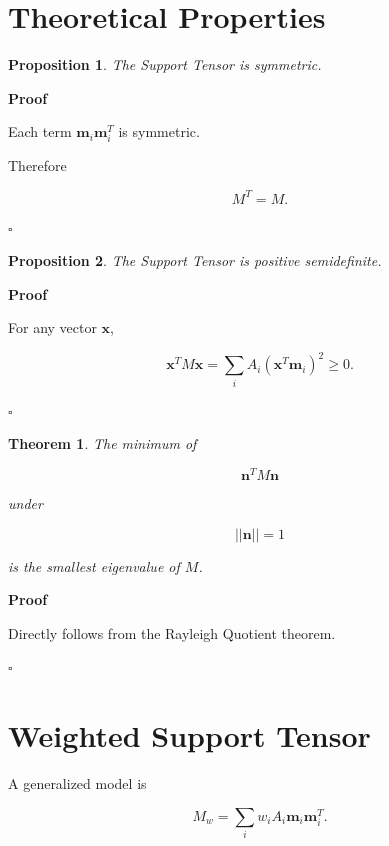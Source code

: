 \documentclass[journal,11pt]{article}
\newtheorem{theorem}{Theorem}
\newtheorem{proposition}{Proposition}
\begin{document}
\section{Theoretical Properties}

\begin{proposition}
The Support Tensor is symmetric.
\end{proposition}

\textbf{Proof}

Each term $\mathbf m_i\mathbf m_i^T$ is symmetric.

Therefore

\begin{equation}
M^T=M.
\end{equation}

\hfill $\square$

\begin{proposition}
The Support Tensor is positive semidefinite.
\end{proposition}

\textbf{Proof}

For any vector $\mathbf x$,

\begin{equation}
\mathbf x^T M \mathbf x
=
\sum_i
A_i(\mathbf x^T\mathbf m_i)^2
\ge 0.
\end{equation}

\hfill $\square$

\begin{theorem}
The minimum of

\begin{equation}
\mathbf n^T M \mathbf n
\end{equation}

under

\begin{equation}
||\mathbf n||=1
\end{equation}

is the smallest eigenvalue of $M$.
\end{theorem}

\textbf{Proof}

Directly follows from the Rayleigh Quotient theorem.

\hfill $\square$

\section{Weighted Support Tensor}

A generalized model is

\begin{equation}
M_w
=
\sum_i
w_iA_i
\mathbf m_i\mathbf m_i^T.
\end{equation}
\end{document}
